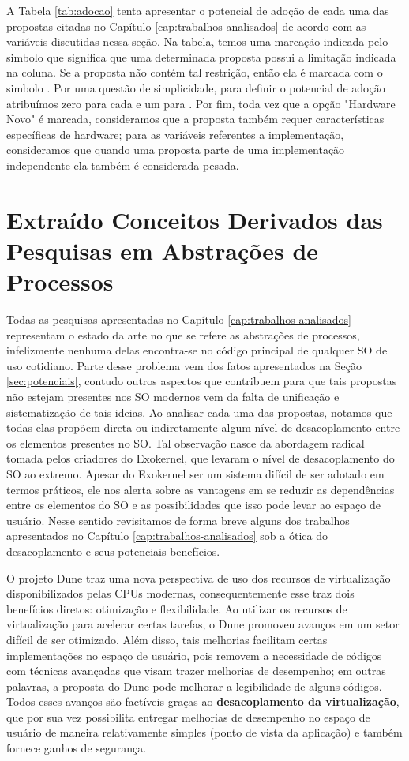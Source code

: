 A Tabela \ref{tab:adocao} tenta apresentar o potencial de adoção de cada uma
das propostas citadas no Capítulo \ref{cap:trabalhos-analisados} de acordo com
as variáveis discutidas nessa seção. Na tabela, temos uma marcação indicada
pelo simbolo  que significa que uma determinada proposta possui a
limitação indicada na coluna. Se a proposta não contém tal restrição, então ela
é marcada com o simbolo . Por uma questão de simplicidade, para
definir o potencial de adoção atribuímos zero para cada  e um para
. Por fim, toda vez que a opção "Hardware Novo" é marcada,
consideramos que a proposta também requer características específicas de
hardware; para as variáveis referentes a implementação, consideramos que quando
uma proposta parte de uma implementação independente ela também é considerada
pesada.



\section{Extraído Conceitos Derivados das Pesquisas em Abstrações de Processos}

Todas as pesquisas apresentadas no Capítulo \ref{cap:trabalhos-analisados}
representam o estado da arte no que se refere as abstrações de processos,
infelizmente nenhuma delas encontra-se no código principal de qualquer SO de
uso cotidiano. Parte desse problema vem dos fatos apresentados na Seção
\ref{sec:potenciais}, contudo outros aspectos que contribuem para que tais
propostas não estejam presentes nos SO modernos vem da falta de unificação e
sistematização de tais ideias. Ao analisar cada uma das propostas, notamos que
todas elas propõem direta ou indiretamente algum nível de desacoplamento entre
os elementos presentes no SO. Tal observação nasce da abordagem radical tomada
pelos criadores do Exokernel, que levaram o nível de desacoplamento do SO ao
extremo. Apesar do Exokernel ser um sistema difícil de ser adotado em termos
práticos, ele nos alerta sobre as vantagens em se reduzir as dependências
entre os elementos do SO e as possibilidades que isso pode levar ao espaço de
usuário. Nesse sentido revisitamos de forma breve alguns dos trabalhos
apresentados no Capítulo \ref{cap:trabalhos-analisados} sob a ótica do
desacoplamento e seus potenciais benefícios.

O projeto Dune traz uma nova perspectiva de uso dos recursos de virtualização
disponibilizados pelas CPUs modernas, consequentemente esse traz dois
benefícios diretos: otimização e flexibilidade. Ao utilizar os recursos de
virtualização para acelerar certas tarefas, o Dune promoveu avanços em um setor
difícil de ser otimizado. Além disso, tais melhorias facilitam certas
implementações no espaço de usuário, pois removem a necessidade de códigos com
técnicas avançadas que visam trazer melhorias de desempenho; em outras
palavras, a proposta do Dune pode melhorar a legibilidade de alguns códigos.
Todos esses avanços são factíveis graças ao \textbf{desacoplamento da
virtualização}, que por sua vez possibilita entregar melhorias de desempenho no
espaço de usuário de maneira relativamente simples (ponto de vista da
aplicação) e também fornece ganhos de segurança.

